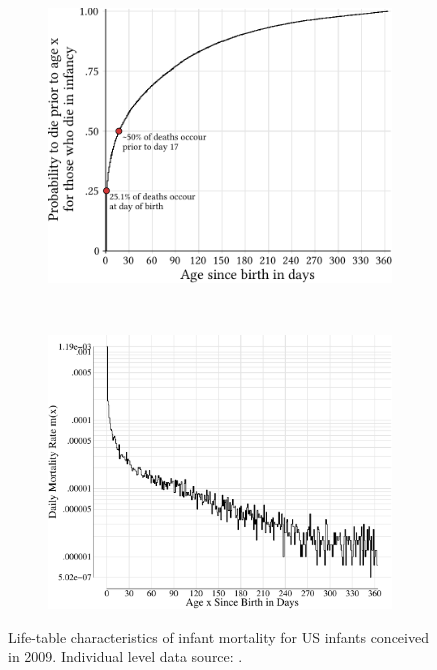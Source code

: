 \documentclass[12pt, parskip=half]{scrartcl}
\begin{document}
\begin{figure}[!htb]
  \begin{subfigure}[t]{0.5\textwidth}
    \centering
    \includegraphics[width = \textwidth]{./fig/us_imort_2009_cumdx.pdf}
    \label{fig:us_imort_2009_cumdx}
    \end{subfigure}%
  ~
    \begin{subfigure}[t]{0.5\textwidth}
    \includegraphics[width = \textwidth]{./fig/us_imort_2009_log_mx.pdf}
    \label{fig:us_imort_2009_log_mx}
    \end{subfigure}%
    \caption{Life-table characteristics of infant mortality for US infants conceived in 2009. Individual level data source: \cite{DVS2015}.}
    \label{fig:us_imort_2009}
\end{figure}
\end{document}
